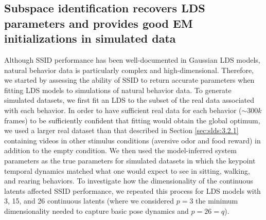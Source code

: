 \subsection{Subspace identification recovers LDS parameters and provides good EM initializations in simulated data}
\label{sec:slds:3.2.6}

Although SSID performance has been well-documented in Gaussian LDS models, natural behavior data is particularly complex and high-dimensional. Therefore, we started by assessing the ability of SSID to return accurate parameters when fitting LDS models to simulations of natural behavior data. To generate simulated datasets, we first fit an LDS to the subset of the real data associated with each behavior. In order to have sufficient real data for each behavior ($\sim300k$ frames) to be sufficiently confident that fitting would obtain the global optimum, we used a larger real dataset than that described in Section \ref{sec:slds:3.2.1} containing videos in other stimulus conditions (aversive odor and food reward) in addition to the empty condition. We then used the model-inferred system parameters as the true parameters for simulated datasets in which the keypoint temporal dynamics matched what one would expect to see in sitting, walking, and rearing behaviors. To investigate how the dimensionality of the continuous latents affected SSID performance, we repeated this process for LDS models with 3, 15, and 26 continuous latents (where we considered $p=3$ the minimum dimensionality needed to capture basic pose dynamics and  $p=26=q$). 